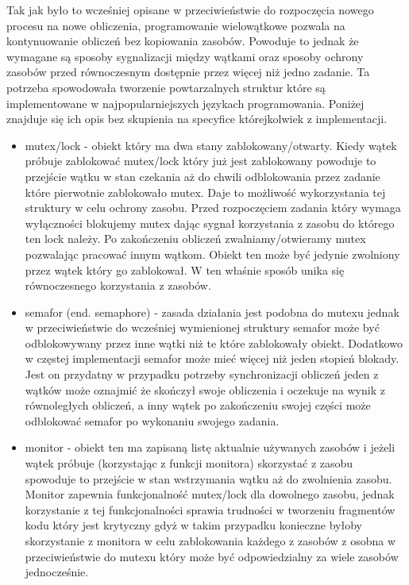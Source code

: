 \documentclass[a4paper,12pt]{article}
\begin{document}
Tak jak było to wcześniej opisane w przeciwieństwie do rozpoczęcia nowego procesu na nowe obliczenia, programowanie wielowątkowe pozwala na kontynuowanie obliczeń bez kopiowania zasobów. 
Powoduje to jednak że wymagane są sposoby sygnalizacji między wątkami oraz sposoby ochrony zasobów przed równoczesnym dostępnie przez więcej niż jedno zadanie. 
Ta potrzeba spowodowała tworzenie powtarzalnych struktur które są implementowane w najpopularniejszych językach programowania. 
Poniżej znajduje się ich opis bez skupienia na specyfice którejkolwiek z implementacji. 
\begin{itemize}
        \item mutex/lock - obiekt który ma dwa stany zablokowany/otwarty.
        Kiedy wątek próbuje zablokować mutex/lock który już jest zablokowany powoduje to przejście wątku w stan czekania aż do chwili odblokowania przez zadanie które pierwotnie zablokowało mutex.
        Daje to możliwość wykorzystania tej struktury w celu ochrony zasobu. Przed rozpoczęciem zadania który wymaga wyłączności blokujemy mutex dając sygnał korzystania z zasobu do którego ten lock należy. 
        Po zakończeniu obliczeń zwalniamy/otwieramy mutex pozwalając pracować innym wątkom. Obiekt ten może być jedynie zwolniony przez wątek który go zablokował. 
        W ten właśnie sposób unika się równoczesnego korzystania z zasobów. 
        \item semafor (end. semaphore) - zasada działania jest podobna do mutexu jednak w przeciwieństwie do wcześniej wymienionej struktury semafor może być odblokowywany przez inne wątki niż te które zablokowały obiekt. Dodatkowo w częstej implementacji semafor może mieć więcej niż jeden stopień blokady. 
        Jest on przydatny w przypadku potrzeby synchronizacji obliczeń jeden z wątków może oznajmić że skończył swoje obliczenia i oczekuje na wynik z równoległych obliczeń, a inny wątek po zakończeniu swojej części może odblokować semafor po wykonaniu swojego zadania.   
        \item monitor - obiekt ten ma zapisaną listę aktualnie używanych zasobów i jeżeli wątek próbuje (korzystając z funkcji monitora) skorzystać z zasobu spowoduje to przejście w stan wstrzymania wątku aż do zwolnienia zasobu. 
        Monitor zapewnia funkcjonalność mutex/lock dla dowolnego zasobu, jednak korzystanie z tej funkcjonalności sprawia trudności w tworzeniu fragmentów kodu który jest krytyczny gdyż w takim przypadku konieczne byłoby skorzystanie z monitora w celu zablokowania każdego z zasobów z osobna w przeciwieństwie do mutexu który może być odpowiedzialny za wiele zasobów jednocześnie.   
\end{itemize} 
\end{document}
